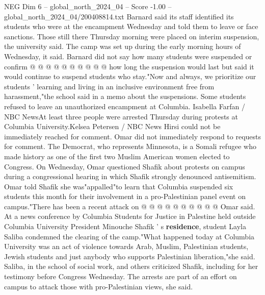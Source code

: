 \begin{textsample}{NEG Dim 6 – global\_north\_2024\_04 – Score -1.00 – global\_north\_2024\_04/200408814.txt}
Barnard said its staff identified its students who were at the encampment Wednesday and told them to leave or face sanctions.
Those still there Thursday morning were placed on interim suspension, the university said.
The camp was set up during the early morning hours of Wednesday, it said.
Barnard did not say how many students were suspended or confirm @ @ @ @ @ @ @ @ @ @ how long the suspension would last but said it would continue to suspend students who stay."Now and always, we prioritize our students ' learning and living in an inclusive environment free from harassment,"the school said in a memo about the suspensions.
Some students refused to leave an unauthorized encampment at Columbia.
Isabella Farfan / NBC NewsAt least three people were arrested Thursday during protests at Columbia University.Kelsea Petersen / NBC News Hirsi could not be immediately reached for comment.
Omar did not immediately respond to requests for comment.
The Democrat, who represents Minnesota, is a Somali refugee who made history as one of the first two Muslim American women elected to Congress.
On Wednesday, Omar questioned Shafik about protests on campus during a congressional hearing in which Shafik strongly denounced antisemitism.
Omar told Shafik she was"appalled"to learn that Columbia suspended six students this month for their involvement in a pro-Palestinian panel event on campus."There has been a recent attack on @ @ @ @ @ @ @ @ @ @ Omar said.
At a news conference by Columbia Students for Justice in Palestine held outside Columbia University President Minouche Shafik ' s \textbf{residence}, student Layla Saliba condemned the clearing of the camp."What happened today at Columbia University was an act of violence towards Arab, Muslim, Palestinian students, Jewish students and just anybody who supports Palestinian liberation,"she said.
Saliba, in the school of social work, and others criticized Shafik, including for her testimony before Congress Wednesday.
The arrests are part of an effort on campus to attack those with pro-Palestinian views, she said.

\end{textsample}
